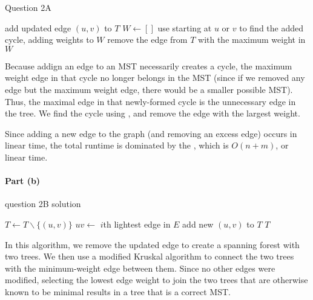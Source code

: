 \documentclass[11pt]{article}
\begin{document}
\begin{algorithm}
\caption{Question 2A}
\begin{algorithmic}[1]
    \State add updated edge $(u,v)$ to $T$
    \State $W \leftarrow []$
    \State use  starting at $u$ or $v$ to find the added cycle,
    adding weights to $W$
    \State remove the edge from $T$ with the maximum weight in $W$
\EndProcedure 
\end{algorithmic}
\end{algorithm}

Because addign an edge to an MST necessarily creates a cycle, the maximum
weight edge in that cycle no longer belongs in the MST (since if we removed any
edge but the maximum weight edge, there would be a smaller possible MST). Thus,
the maximal edge in that newly-formed cycle is the unnecessary edge in the tree.
We find the cycle using , and remove the edge with the largest
weight.

Since adding a new edge to the graph (and removing an excess edge) occurs in
linear time, the total runtime is dominated by the , which is
$O(n+m)$, or linear time.

\pagebreak

\paragraph{Part (b)}

\begin{algorithm}
\caption{question 2B solution}
\begin{algorithmic}[1]
    \State {}
    \State $T \leftarrow T \backslash \{(u,v)\}$
        \State $uv \leftarrow $ $i$th lightest edge in $E$
            \State add new $(u,v)$ to $T$
        \EndIf
    \EndFor
    \State \Return $T$
\EndProcedure 
\end{algorithmic}
\end{algorithm}

In this algorithm, we remove the updated edge to create a spanning forest with
two trees. We then use a modified Kruskal algorithm to connect the two trees with
the minimum-weight edge between them. Since no other edges were modified, 
selecting the lowest edge weight to join the two trees that are otherwise known
to be minimal results in a tree that is a correct MST.
\end{document}
